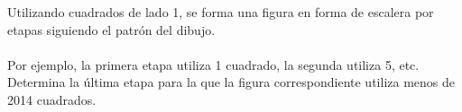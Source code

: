 Utilizando cuadrados de lado 1, se forma una figura en forma de escalera por etapas siguiendo el patrón del dibujo. \\\\
Por ejemplo, la primera etapa utiliza 1 cuadrado, la segunda utiliza 5, etc. Determina la última etapa para la que la figura correspondiente utiliza menos de 2014 cuadrados.
